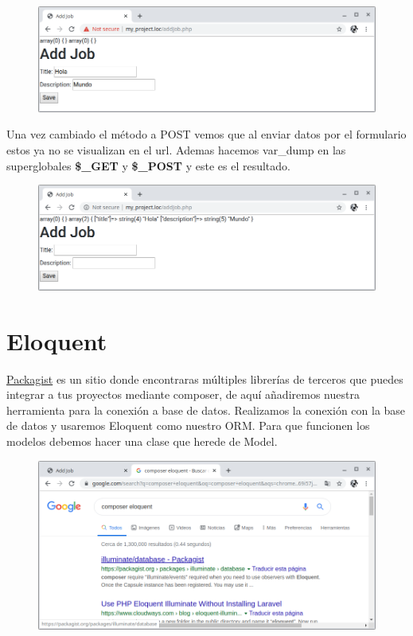 \documentclass{article}
\begin{document}
\begin{figure}[h!]
  \centering
  \includegraphics[scale=0.5]{./Pictures/070_post.png}
\end{figure}

Una vez cambiado el método a POST vemos que al enviar datos por el formulario
estos ya no se visualizan en el url. Ademas hacemos var\_dump en las
superglobales \textbf{\$\_GET} y \textbf{\$\_POST} y este es el resultado.\\

\begin{figure}[h!]
  \centering
  \includegraphics[scale=0.5]{./Pictures/071_post.png}
\end{figure}

\section{Eloquent}%
\href{https://packagist.org/}{Packagist} es un sitio donde encontraras
múltiples librerías de terceros que puedes integrar a tus proyectos mediante
composer, de aquí añadiremos nuestra herramienta para la conexión a base de
datos. Realizamos la conexión con la base de datos y usaremos Eloquent como nuestro
ORM. Para que funcionen los modelos debemos hacer una clase que herede de
Model.\\

\begin{figure}[h!]
  \centering
  \includegraphics[scale=0.5]{./Pictures/072_composer_eloquent.png}
\end{figure}
\end{document}
